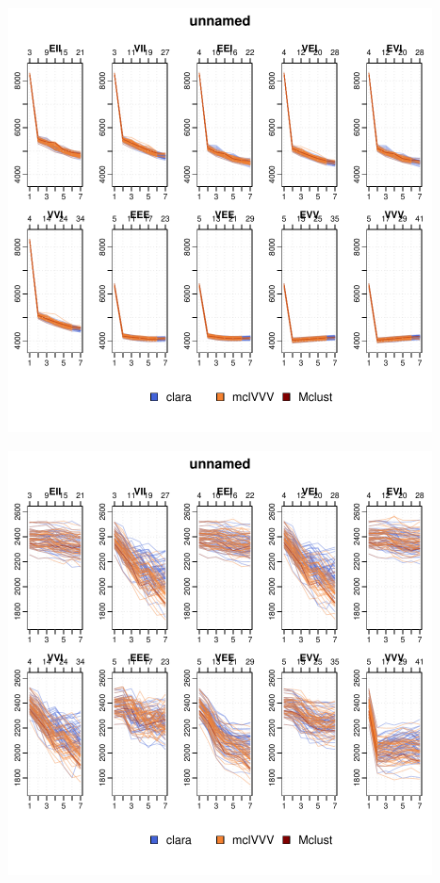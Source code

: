 \begin{figure}
    \centering
\includegraphics{App_plots-010}
\end{figure}

\begin{figure}
    \centering
\includegraphics{App_plots-011}
\end{figure}


